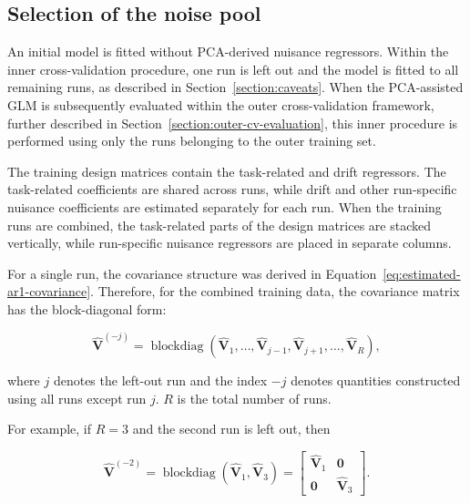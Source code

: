 \documentclass[english]{pwr_wmat_praca_dyplomowa}
\theoremstyle{definition}
\theoremstyle{remark}
\begin{document}
\subsection{Selection of the noise pool}
\label{section:selection-noise}

An initial model is fitted without PCA-derived nuisance regressors. Within the inner cross-validation procedure, one run is left out and the model is fitted to all remaining runs, as described in Section~\ref{section:caveats}. When the PCA-assisted GLM is subsequently evaluated within the outer cross-validation framework, further described in Section~\ref{section:outer-cv-evaluation}, this inner procedure is performed using only the runs belonging to the outer training set. 

The training design matrices contain the task-related and drift regressors. The task-related coefficients are shared across runs, while drift and other run-specific nuisance coefficients are estimated separately for each run. When the training runs are combined, the task-related parts of the design matrices are stacked vertically, while run-specific nuisance regressors are placed in separate columns.


For a single run, the covariance structure was derived in Equation~\eqref{eq:estimated-ar1-covariance}. Therefore, for the combined training data, the covariance matrix has the block-diagonal form:

\begin{equation}
    \widehat{\mathbf{V}}^{(-j)} =
    \operatorname{blockdiag}
    \left(\widehat{\mathbf{V}}_1, \ldots, \widehat{\mathbf{V}}_{j-1}, \widehat{\mathbf{V}}_{j+1}, \ldots, \widehat{\mathbf{V}}_R\right),
\end{equation}

where $j$ denotes the left-out run and the index $-j$ denotes quantities constructed using all runs except run $j$. $R$ is the total number of runs.

For example, if $R = 3$ and the second run is left out, then

\begin{equation}
    \widehat{\mathbf{V}}^{(-2)}
    =
    \operatorname{blockdiag}
    \left(
        \widehat{\mathbf{V}}_1,
        \widehat{\mathbf{V}}_3
    \right)
    =
    \begin{bmatrix}
        \widehat{\mathbf{V}}_1 & \mathbf{0} \\
        \mathbf{0} & \widehat{\mathbf{V}}_3
    \end{bmatrix}.
\end{equation}
\end{document}
